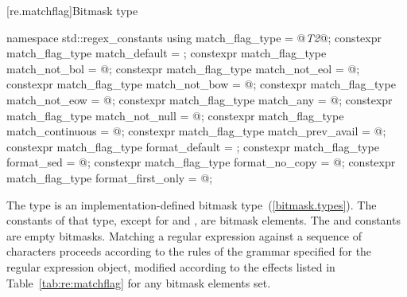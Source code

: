[re.matchflag]{Bitmask type }

%
%
%
%
%
%
%
%
%
%
%
%
%
%
%
\begin{codeblock}
namespace std::regex_constants {
  using match_flag_type = @\textit{T2}@;
  constexpr match_flag_type match_default = {};
  constexpr match_flag_type match_not_bol = @\unspec@;
  constexpr match_flag_type match_not_eol = @\unspec@;
  constexpr match_flag_type match_not_bow = @\unspec@;
  constexpr match_flag_type match_not_eow = @\unspec@;
  constexpr match_flag_type match_any = @\unspec@;
  constexpr match_flag_type match_not_null = @\unspec@;
  constexpr match_flag_type match_continuous = @\unspec@;
  constexpr match_flag_type match_prev_avail = @\unspec@;
  constexpr match_flag_type format_default = {};
  constexpr match_flag_type format_sed = @\unspec@;
  constexpr match_flag_type format_no_copy = @\unspec@;
  constexpr match_flag_type format_first_only = @\unspec@;
}
\end{codeblock}

\pnum
{}%
The type  is an implementation-defined bitmask
type~(\ref{bitmask.types}).
The constants of that type, except for  and
, are bitmask elements. The  and
 constants are empty bitmasks.
Matching a regular expression against a sequence of characters
 proceeds according to the rules of the grammar specified for the regular
expression object, modified according to the effects listed in Table~\ref{tab:re:matchflag} for
any bitmask elements set.

